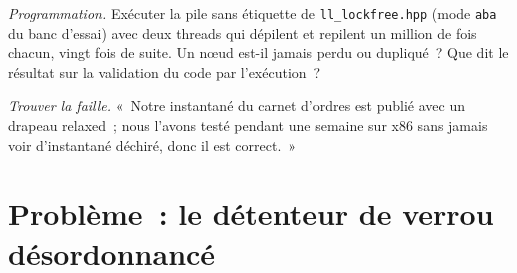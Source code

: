 \begin{exercise}[$\star\star\star$]\label{exo:ll:lock-free-programming:7}
\emph{Programmation.} Exécuter la pile sans étiquette de \texttt{ll\_lockfree.hpp} (mode \texttt{aba} du banc d'essai) avec deux threads
qui dépilent et repilent un million de fois chacun, vingt fois de suite. Un nœud est-il jamais perdu ou dupliqué~? Que dit le résultat
sur la validation du code  par l'exécution~?
\end{exercise}

\begin{exercise}[$\star\star\star$]\label{exo:ll:lock-free-programming:8}
\emph{Trouver la faille.} «~Notre instantané du carnet d'ordres est publié avec un drapeau relaxed~; nous l'avons testé pendant une semaine sur x86 sans
jamais voir d'instantané déchiré, donc il est correct.~»
\end{exercise}

\section{Problème~: le détenteur de verrou désordonnancé}

